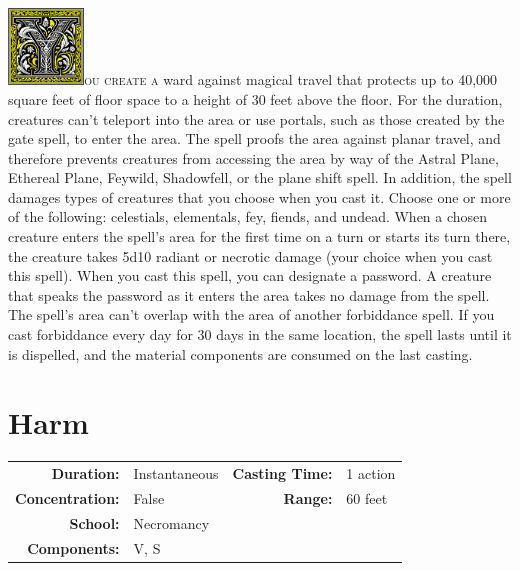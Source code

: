 \documentclass[12pt,showtrims]{memoir}
\begin{document}
\vspace{1\baselineskip}\noindent
\lettrine[lines=4]{\includegraphics[height=58pt]{initials/Y.png}}{ou create a} ward against magical travel that protects up to 40,000 square feet of floor space to a height of 30 feet above the floor. For the duration, creatures can't teleport into the area or use portals, such as those created by the gate spell, to enter the area. The spell proofs the area against planar travel, and therefore prevents creatures from accessing the area by way of the Astral Plane, Ethereal Plane, Feywild, Shadowfell, or the plane shift spell. In addition, the spell damages types of creatures that you choose when you cast it. Choose one or more of the following: celestials, elementals, fey, fiends, and undead. When a chosen creature enters the spell's area for the first time on a turn or starts its turn there, the creature takes 5d10 radiant or necrotic damage (your choice when you cast this spell). When you cast this spell, you can designate a password. A creature that speaks the password as it enters the area takes no damage from the spell. The spell's area can't overlap with the area of another forbiddance spell. If you cast forbiddance every day for 30 days in the same location, the spell lasts until it is dispelled, and the material components are consumed on the last casting.

\newpage
\section*{Harm}

{
\small\centering\vspace{-6pt}
\begin{tabular}{rlrl}
\toprule

\textbf{Duration:} & Instantaneous &
\textbf{Casting Time:} & 1 action \\
\textbf{Concentration:} & False &
\textbf{Range:} & 60 feet \\
\textbf{School:} & Necromancy \\
\textbf{Components:} & \multicolumn{3}{p{0.7\textwidth}}{V, S}\\

\bottomrule
\end{tabular}
}
\end{document}
